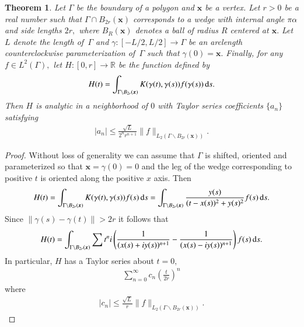 \documentclass[12pt,times]{elsarticle}
\newcommand{\bx}{\boldsymbol{x}}
\newtheorem{theorem}{Theorem}
\begin{document}
\begin{theorem}
Let $\Gamma$ be the boundary of a polygon and $\bx$ be a vertex. Let $r>0$ be a real number such that $\Gamma \cap B_{2r}(\bx)$ corresponds to a wedge with internal angle $\pi \alpha$ and side lengths $2r,$ where $B_R(\bx)$ denotes a ball of radius $R$ centered at $\bx.$ Let $L$ denote the length of\, $\Gamma$ and $\gamma: [-L/2,L/2]\to \Gamma$ be an arclength counterclockwise parameterization of\, $\Gamma$ such that $\gamma(0) = \bx.$ Finally, for any $f \in L^2(\Gamma),$ let $H:[0,r] \to \mathbb{R}$ be the function defined by
\begin{align}
H(t) = \int_{\Gamma\backslash B_{2r}(\bx)} K(\gamma(t),\gamma(s)) f(\gamma(s))\,{\rm d}s.
\end{align}
Then $H$ is analytic in a neighborhood of $0$ with Taylor series coefficients $\{ a_n\}$ satisfying
\begin{align}
|a_n| \le \frac{\sqrt{L}}{2^nr^{n+1}} \|f\|_{L_2(\Gamma \backslash B_{2r}(\bx))}.
\end{align}
\end{theorem}
\begin{proof}
Without loss of generality we can assume that $\Gamma$ is shifted, oriented and parameterized so that $\bx = \gamma(0)= 0$ and the leg of the wedge corresponding to positive $t$ is oriented along the positive $x$ axis. Then
\begin{align}
H(t) = \int_{\Gamma\backslash B_{2r}(\bx)} K(\gamma(t),\gamma(s)) f(s)\,{\rm d}s = \int_{\Gamma\backslash B_{2r}(\bx)} \frac{y(s)}{(t-x(s))^2+y(s)^2}f(s)\,{\rm d}s.
\end{align}
Since $\|\gamma(s)-\gamma(t)\| >2r$ it follows that
\begin{align}
H(t) =\int _{\Gamma\backslash B_{2r}(\bx)}\sum {t^n i}\left(\frac{1}{(x(s)+i y(s))^{n+1}}-\frac{1}{(x(s)-i y(s))^{n+1}} \right) f(s)\,{\rm d}s.
\end{align}
In particular, $H$ has a Taylor series about $t=0,$
\begin{align}
\sum_{n=0}^\infty c_n \left(\frac{t}{2r}\right)^n
\end{align}
where
\begin{align}
|c_n| \le  \frac{\sqrt{L}}{r} \|f\|_{L_2(\Gamma \backslash B_{2r}(\bx))}.
\end{align}
\end{proof}
\end{document}
